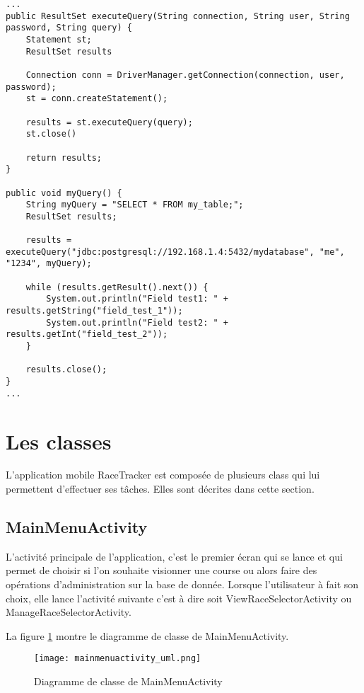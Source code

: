 \begin{lstlisting}[style=JavaStyle]
...
public ResultSet executeQuery(String connection, String user, String password, String query) {
	Statement st;
	ResultSet results

	Connection conn = DriverManager.getConnection(connection, user, password);
	st = conn.createStatement();
	
	results = st.executeQuery(query);
	st.close()	
	
	return results;
}

public void myQuery() {
	String myQuery = "SELECT * FROM my_table;";
	ResultSet results;
	
	results = executeQuery("jdbc:postgresql://192.168.1.4:5432/mydatabase", "me", "1234", myQuery);
	
	while (results.getResult().next()) {
		System.out.println("Field test1: " + results.getString("field_test_1"));
		System.out.println("Field test2: " + results.getInt("field_test_2"));
	}
	
	results.close();	
}
...
\end{lstlisting}

\section{Les classes}

L'application mobile RaceTracker est composée de plusieurs class qui lui permettent d'effectuer ses tâches. Elles sont décrites dans cette section.

\subsection{MainMenuActivity}

L'activité principale de l'application, c'est le premier écran qui se lance et qui permet de choisir si l'on souhaite visionner une course ou alors faire des opérations d'administration sur la base de donnée. Lorsque l'utilisateur à fait son choix, elle lance l'activité suivante c'est à dire soit ViewRaceSelectorActivity ou ManageRaceSelectorActivity.

La figure \ref{fig:mainmenuactivity_uml} montre le diagramme de classe de MainMenuActivity.

\begin{figure}[htb]
\centering 
\texttt{[image: mainmenuactivity\_uml.png]} 
\caption{Diagramme de classe de MainMenuActivity}
\label{fig:mainmenuactivity_uml}
 \end{figure}

